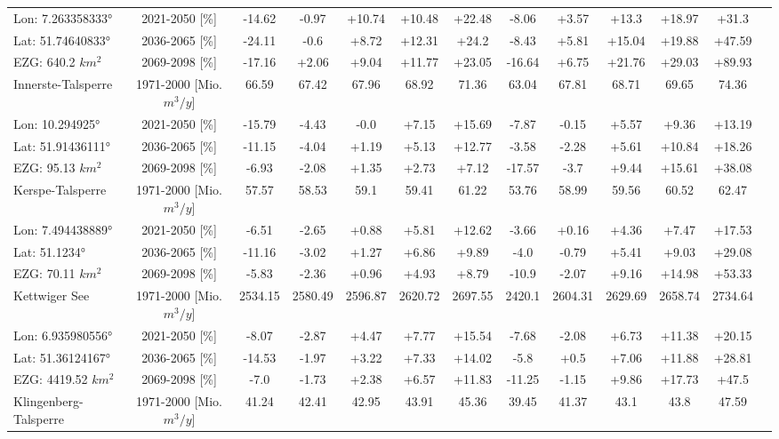 \begin{longtable}{@{\extracolsep{\fill}}lc|ccccc||cccccc}
\cline{2-12} 
Lon: 7.263358333° & 2021-2050 [\%]  & -14.62 & -0.97 & +10.74 & +10.48 & +22.48 & -8.06 & +3.57 & +13.3 & +18.97 & +31.3\\ 
Lat: 51.74640833° & 2036-2065 [\%]  & -24.11 & -0.6 & +8.72 & +12.31 & +24.2 & -8.43 & +5.81 & +15.04 & +19.88 & +47.59\\ 
EZG: 640.2 $km^2$ & 2069-2098 [\%]  & -17.16 & +2.06 & +9.04 & +11.77 & +23.05 & -16.64 & +6.75 & +21.76 & +29.03 & +89.93\\ 
\hline 
Innerste-Talsperre & 1971-2000 [Mio. $m^3/y$]  & 66.59 & 67.42 & 67.96 & 68.92 & 71.36 & 63.04 & 67.81 & 68.71 & 69.65 & 74.36\\ 
\cline{2-12} 
Lon: 10.294925° & 2021-2050 [\%]  & -15.79 & -4.43 & -0.0 & +7.15 & +15.69 & -7.87 & -0.15 & +5.57 & +9.36 & +13.19\\ 
Lat: 51.91436111° & 2036-2065 [\%]  & -11.15 & -4.04 & +1.19 & +5.13 & +12.77 & -3.58 & -2.28 & +5.61 & +10.84 & +18.26\\ 
EZG: 95.13 $km^2$ & 2069-2098 [\%]  & -6.93 & -2.08 & +1.35 & +2.73 & +7.12 & -17.57 & -3.7 & +9.44 & +15.61 & +38.08\\ 
\hline 
Kerspe-Talsperre & 1971-2000 [Mio. $m^3/y$]  & 57.57 & 58.53 & 59.1 & 59.41 & 61.22 & 53.76 & 58.99 & 59.56 & 60.52 & 62.47\\ 
\cline{2-12} 
Lon: 7.494438889° & 2021-2050 [\%]  & -6.51 & -2.65 & +0.88 & +5.81 & +12.62 & -3.66 & +0.16 & +4.36 & +7.47 & +17.53\\ 
Lat: 51.1234° & 2036-2065 [\%]  & -11.16 & -3.02 & +1.27 & +6.86 & +9.89 & -4.0 & -0.79 & +5.41 & +9.03 & +29.08\\ 
EZG: 70.11 $km^2$ & 2069-2098 [\%]  & -5.83 & -2.36 & +0.96 & +4.93 & +8.79 & -10.9 & -2.07 & +9.16 & +14.98 & +53.33\\ 
\hline 
Kettwiger See & 1971-2000 [Mio. $m^3/y$]  & 2534.15 & 2580.49 & 2596.87 & 2620.72 & 2697.55 & 2420.1 & 2604.31 & 2629.69 & 2658.74 & 2734.64\\ 
\cline{2-12} 
Lon: 6.935980556° & 2021-2050 [\%]  & -8.07 & -2.87 & +4.47 & +7.77 & +15.54 & -7.68 & -2.08 & +6.73 & +11.38 & +20.15\\ 
Lat: 51.36124167° & 2036-2065 [\%]  & -14.53 & -1.97 & +3.22 & +7.33 & +14.02 & -5.8 & +0.5 & +7.06 & +11.88 & +28.81\\ 
EZG: 4419.52 $km^2$ & 2069-2098 [\%]  & -7.0 & -1.73 & +2.38 & +6.57 & +11.83 & -11.25 & -1.15 & +9.86 & +17.73 & +47.5\\ 
\hline 
Klingenberg-Talsperre & 1971-2000 [Mio. $m^3/y$]  & 41.24 & 42.41 & 42.95 & 43.91 & 45.36 & 39.45 & 41.37 & 43.1 & 43.8 & 47.59\\ 

\end{longtable}
